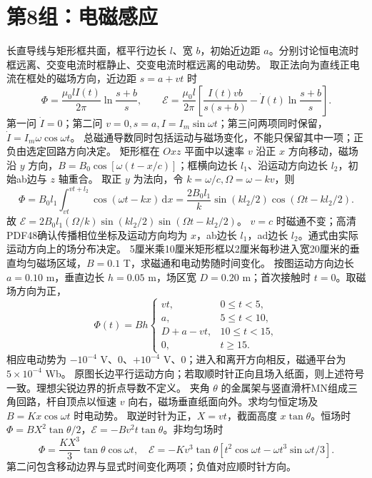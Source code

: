 \section{第8组：电磁感应}
\problemtext 长直导线与矩形框共面，框平行边长 $l$、宽 $b$，初始近边距 $a$。分别讨论恒电流时框远离、交变电流时框静止、交变电流时框远离的电动势。
\workings 取正法向为直线正电流在框处的磁场方向，近边距 $s=a+vt$ 时
\[
\Phi=\frac{\mu_0 l I(t)}{2\pi}\ln\frac{s+b}{s},\qquad
\mathcal E=\frac{\mu_0 l}{2\pi}\left[\frac{I(t)vb}{s(s+b)}-\dot I(t)\ln\frac{s+b}{s}\right].
\]
第一问 $\dot I=0$；第二问 $v=0,s=a,I=I_m\sin\omega t$；第三问两项同时保留，$\dot I=I_m\omega\cos\omega t$。
\crosscheck 总磁通导数同时包括运动与磁场变化，不能只保留其中一项；正负由选定回路方向决定。
\problemtext 矩形框在 $Oxz$ 平面中以速率 $v$ 沿正 $x$ 方向移动，磁场沿 $y$ 方向，$B=B_0\cos[\omega(t-x/c)]$；框横向边长 $l_1$、沿运动方向边长 $l_2$，初始ab边与 $z$ 轴重合。
\workings 取正 $y$ 为法向，令 $k=\omega/c,\Omega=\omega-kv$，则
\[
\Phi=B_0l_1\int_{vt}^{vt+l_2}\cos(\omega t-kx)\,\mathrm dx
=\frac{2B_0l_1}{k}\sin(kl_2/2)\cos(\Omega t-kl_2/2).
\]
故 $\mathcal E=2B_0l_1(\Omega/k)\sin(kl_2/2)\sin(\Omega t-kl_2/2)$。
\crosscheck $v=c$ 时磁通不变；高清PDF48确认传播相位坐标及运动方向均为 $x$，ab边长 $l_1$，ad边长 $l_2$。通式由实际运动方向上的场分布决定。
\problemtext 5厘米乘10厘米矩形框以2厘米每秒进入宽20厘米的垂直均匀磁场区域，$B=0.1$ T，求磁通和电动势随时间变化。
\workings 按图运动方向边长 $a=0.10$ m，垂直边长 $h=0.05$ m，场区宽 $D=0.20$ m；首次接触时 $t=0$。取磁场方向为正，
\[
\Phi(t)=Bh\begin{cases}vt,&0\le t<5,\\a,&5\le t<10,\\D+a-vt,&10\le t<15,\\0,&t\ge15.\end{cases}
\]
相应电动势为 $-10^{-4}$ V、0、$+10^{-4}$ V、0；进入和离开方向相反，磁通平台为 $5\times10^{-4}$ Wb。
\crosscheck 原图长边平行运动方向；若取顺时针正向且场入纸面，则上述符号一致。理想尖锐边界的折点导数不定义。
\problemtext 夹角 $\theta$ 的金属架与竖直滑杆MN组成三角回路，杆自顶点以恒速 $v$ 向右，磁场垂直纸面向外。求均匀恒定场及 $B=Kx\cos\omega t$ 时电动势。
\workings 取逆时针为正，$X=vt$，截面高度 $x\tan\theta$。恒场时 $\Phi=B X^2\tan\theta/2$，$\mathcal E=-Bv^2t\tan\theta$。非均匀场时
\[
\Phi=\frac{KX^3}{3}\tan\theta\cos\omega t,\quad
\mathcal E=-Kv^3\tan\theta[t^2\cos\omega t-\omega t^3\sin\omega t/3].
\]
\crosscheck 第二问包含移动边界与显式时间变化两项；负值对应顺时针方向。
